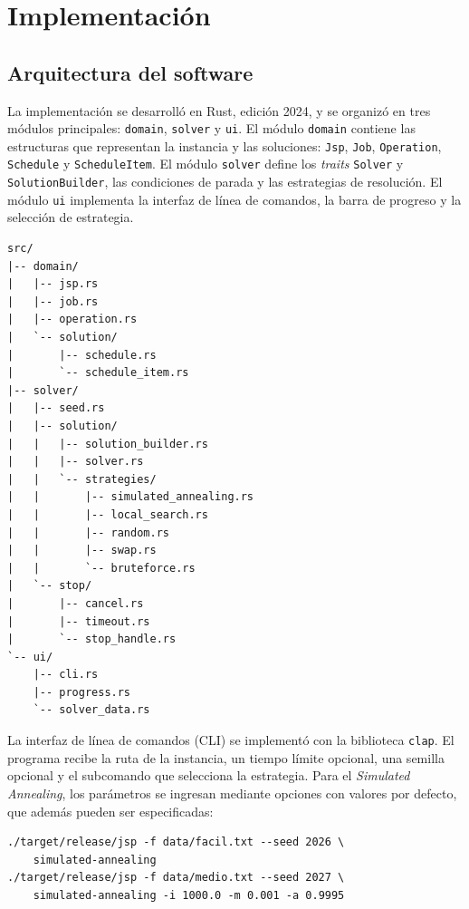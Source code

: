 \chapter{Implementación}
\label{ch:implementacion}

\section{Arquitectura del software}

La implementación se desarrolló en Rust, edición 2024, y se organizó en tres módulos principales:
\texttt{domain}, \texttt{solver} y \texttt{ui}.
El módulo \texttt{domain} contiene las estructuras que representan la instancia y las soluciones:
\texttt{Jsp}, \texttt{Job}, \texttt{Operation}, \texttt{Schedule} y \texttt{ScheduleItem}.
El módulo \texttt{solver} define los \emph{traits} \texttt{Solver} y \texttt{SolutionBuilder},
las condiciones de parada y las estrategias de resolución.
El módulo \texttt{ui} implementa la interfaz de línea de comandos, la barra de progreso y la selección de estrategia.

\begin{verbatim}
src/
|-- domain/
|   |-- jsp.rs
|   |-- job.rs
|   |-- operation.rs
|   `-- solution/
|       |-- schedule.rs
|       `-- schedule_item.rs
|-- solver/
|   |-- seed.rs
|   |-- solution/
|   |   |-- solution_builder.rs
|   |   |-- solver.rs
|   |   `-- strategies/
|   |       |-- simulated_annealing.rs
|   |       |-- local_search.rs
|   |       |-- random.rs
|   |       |-- swap.rs
|   |       `-- bruteforce.rs
|   `-- stop/
|       |-- cancel.rs
|       |-- timeout.rs
|       `-- stop_handle.rs
`-- ui/
    |-- cli.rs
    |-- progress.rs
    `-- solver_data.rs
\end{verbatim}

La interfaz de línea de comandos (CLI) se implementó con la biblioteca \texttt{clap}.
El programa recibe la ruta de la instancia, un tiempo límite opcional, una semilla opcional y
el subcomando que selecciona la estrategia. Para el \emph{Simulated Annealing},
los parámetros se ingresan mediante opciones con valores por defecto, que además pueden ser especificadas:

\begin{verbatim}
./target/release/jsp -f data/facil.txt --seed 2026 \
    simulated-annealing
./target/release/jsp -f data/medio.txt --seed 2027 \
    simulated-annealing -i 1000.0 -m 0.001 -a 0.9995
\end{verbatim}

